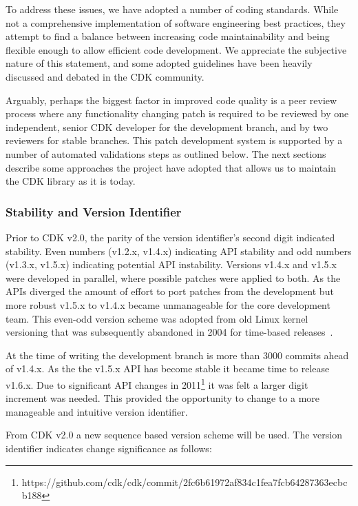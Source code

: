 \documentclass[doublespacing]{bmcart}
\def \cdkversion {v2.0}
\begin{document}
To address these issues, we have adopted a number of coding
standards. While not a comprehensive implementation of software
engineering best practices, they attempt to find a balance between
increasing code maintainability and being flexible enough to allow
efficient code development. We appreciate the subjective
nature of this statement, and some adopted guidelines have been
heavily discussed and debated in the CDK community.

Arguably, perhaps the biggest factor in improved code quality is a
peer review process where any functionality changing patch is required
to be reviewed by one independent, senior CDK developer for the
development branch, and by two reviewers for stable branches. This patch
development system is supported by a number of automated validations
steps as outlined below.
The next sections describe some approaches the project have adopted that allows
us to maintain the CDK library as it is today. 

\subsubsection*{Stability and Version Identifier}

Prior to CDK \cdkversion{}, the parity of the version identifier's second digit 
indicated stability. Even numbers (v1.2.x, v1.4.x) indicating API stability and
odd numbers (v1.3.x, v1.5.x) indicating potential API instability. Versions 
v1.4.x and v1.5.x were developed in parallel, where possible patches were
applied to both. As the APIs diverged the amount of effort to port patches
from the development but more robust v1.5.x to v1.4.x 
became unmanageable for the core development team. This even-odd version scheme
was adopted from old Linux kernel versioning that was subsequently
abandoned in 2004 for time-based releases~\cite{LinuxKernalVersionNumbering}.

At the time of writing the development branch is more than 3000 commits ahead
of v1.4.x. As the the v1.5.x API has become stable it became time to release 
v1.6.x. Due to significant API changes in 2011\footnote{https://github.com/cdk/cdk/commit/2fc6b61972af834c1fea7fcb64287363ecbcb188}
it was felt a larger digit increment was needed. This provided the 
opportunity to change to a more manageable and intuitive version identifier.

From CDK \cdkversion{} a new sequence based version scheme will be used. The
version identifier indicates change significance as follows:
\end{document}

